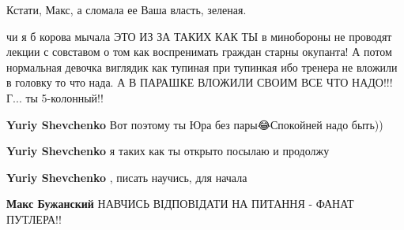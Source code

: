 \begin{itemize}
Кстати, Макс, а сломала ее Ваша власть, зеленая.

 

чи я б корова мычала ЭТО ИЗ ЗА ТАКИХ КАК ТЫ в минобороны не проводят лекции с
совставом о том как воспренимать граждан старны окупанта! А потом нормальная
девочка виглядик как тупиная при тупинкая ибо тренера не вложили в головку то
что нада. А В ПАРАШКЕ ВЛОЖИЛИ СВОИМ ВСЕ ЧТО НАДО!!! Г... ты 5-колонный!!

\begin{itemize}
 
\textbf{Yuriy Shevchenko} Вот поэтому ты Юра без пары😂Спокойней надо быть))

 
\textbf{Yuriy Shevchenko} я таких как ты открыто посылаю и продолжу

 
\textbf{Yuriy Shevchenko} , писать научись, для начала

 
\textbf{Макс Бужанский} НАВЧИСЬ ВІДПОВІДАТИ НА ПИТАННЯ - ФАНАТ ПУТЛЕРА!!

 

\end{itemize}
\end{itemize}
